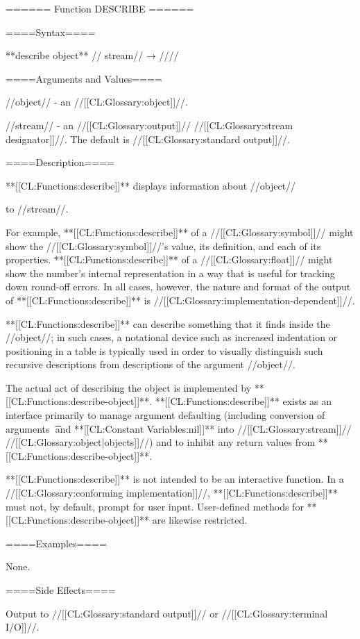 ====== Function DESCRIBE ======

====Syntax====

**describe {object** //\opt} stream// → //\novalues//

====Arguments and Values====

//object// - an //[[CL:Glossary:object]]//.

//stream// - an //[[CL:Glossary:output]]// //[[CL:Glossary:stream designator]]//. The default is //[[CL:Glossary:standard output]]//.

====Description====

**[[CL:Functions:describe]]** displays information about //object//

to //stream//.

For example, **[[CL:Functions:describe]]** of a //[[CL:Glossary:symbol]]// might show the //[[CL:Glossary:symbol]]//'s value, its definition, and each of its properties. **[[CL:Functions:describe]]** of a //[[CL:Glossary:float]]// might show the number's internal representation in a way that is useful for tracking down round-off errors. In all cases, however, the nature and format of the output of **[[CL:Functions:describe]]** is //[[CL:Glossary:implementation-dependent]]//.

**[[CL:Functions:describe]]** can describe something that it finds inside the //object//; in such cases, a notational device such as increased indentation or positioning in a table is typically used in order to visually distinguish such recursive descriptions from descriptions of the argument //object//.

The actual act of describing the object is implemented by **[[CL:Functions:describe-object]]**. **[[CL:Functions:describe]]** exists as an interface primarily to manage argument defaulting (including conversion of arguments \t\ and **[[CL:Constant Variables:nil]]** into //[[CL:Glossary:stream]]// //[[CL:Glossary:object|objects]]//) and to inhibit any return values from **[[CL:Functions:describe-object]]**.

**[[CL:Functions:describe]]** is not intended to be an interactive function. In a //[[CL:Glossary:conforming implementation]]//, **[[CL:Functions:describe]]** must not, by default, prompt for user input. User-defined methods for **[[CL:Functions:describe-object]]** are likewise restricted.

====Examples====

None.

====Side Effects====

Output to //[[CL:Glossary:standard output]]// or //[[CL:Glossary:terminal I/O]]//.

